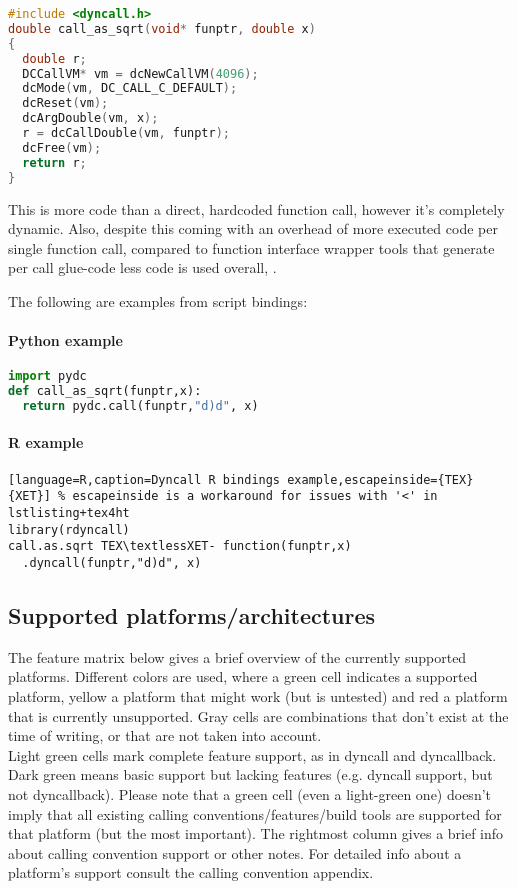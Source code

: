 \begin{lstlisting}[language=c,caption=Dyncall C library example]
#include <dyncall.h>
double call_as_sqrt(void* funptr, double x)
{
  double r;
  DCCallVM* vm = dcNewCallVM(4096);
  dcMode(vm, DC_CALL_C_DEFAULT);
  dcReset(vm);
  dcArgDouble(vm, x);  
  r = dcCallDouble(vm, funptr);
  dcFree(vm);
  return r;
}
\end{lstlisting}

This is more code than a direct, hardcoded function call, however it's completely dynamic.
Also, despite this coming with an overhead of more executed code per single function call,
compared to function interface wrapper tools that generate per call glue-code less code is
used overall, . %

The following are examples from script bindings:

\paragraph{Python example}

\begin{lstlisting}[language=python,caption=Dyncall Python bindings example]
import pydc
def call_as_sqrt(funptr,x):
  return pydc.call(funptr,"d)d", x)
\end{lstlisting}


\paragraph{R example}

\begin{lstlisting}[language=R,caption=Dyncall R bindings example,escapeinside={TEX}{XET}] % escapeinside is a workaround for issues with '<' in lstlisting+tex4ht
library(rdyncall)
call.as.sqrt TEX\textlessXET- function(funptr,x)
  .dyncall(funptr,"d)d", x)
\end{lstlisting}


\pagebreak

\subsection{Supported platforms/architectures}

The feature matrix below gives a brief overview of the currently supported
platforms. Different colors are used, where a green cell indicates a supported
platform, yellow a platform that might work (but is untested) and red a platform
that is currently unsupported. Gray cells are combinations that don't exist
at the time of writing, or that are not taken into account.\\
Light green cells mark complete feature support, as in dyncall and dyncallback. Dark green means basic support but lacking features (e.g. dyncall support, but not dyncallback).
Please note that a green cell (even a light-green one) doesn't imply that all existing calling conventions/features/build tools are supported for that platform (but the most
important). The rightmost column gives a brief info about calling convention support or other notes.
For detailed info about a platform's support consult the calling convention appendix.


